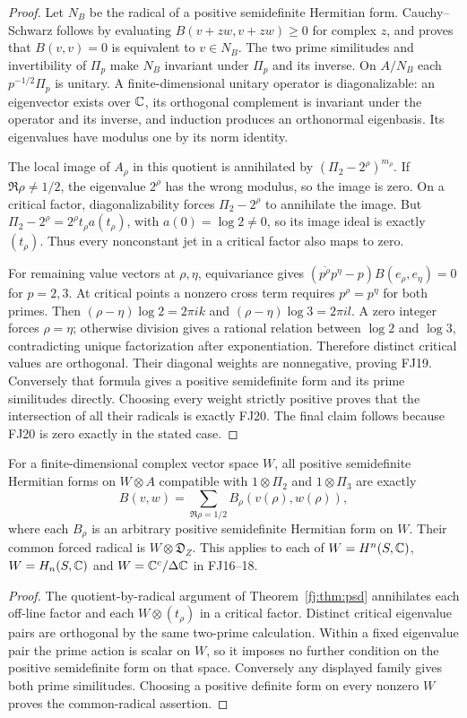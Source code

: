\begin{proof}
Let $N_B$ be the radical of a positive semidefinite Hermitian form.
Cauchy--Schwarz follows by evaluating $B(v+zw,v+zw)\ge0$ for complex
$z$, and proves that $B(v,v)=0$ is equivalent to $v\in N_B$.
The two prime similitudes and invertibility of $\Pi_p$ make $N_B$
invariant under $\Pi_p$ and its inverse. On $A/N_B$ each
$p^{-1/2}\Pi_p$ is unitary. A finite-dimensional unitary operator is
diagonalizable: an eigenvector exists over $\mathbb C$, its orthogonal
complement is invariant under the operator and its inverse, and
induction produces an orthonormal eigenbasis. Its eigenvalues have
modulus one by its norm identity.

The local image of $A_\rho$ in this quotient is annihilated by
$(\Pi_2-2^\rho)^{m_\rho}$. If $\Re\rho\ne1/2$, the eigenvalue
$2^\rho$ has the wrong modulus, so the image is zero. On a critical
factor, diagonalizability forces $\Pi_2-2^\rho$ to annihilate the
image. But
$\Pi_2-2^\rho=2^\rho t_\rho a(t_\rho)$, with
$a(0)=\log2\ne0$, so its image ideal is exactly $(t_\rho)$.
Thus every nonconstant jet in a critical factor also maps to zero.

For remaining value vectors at $\rho,\eta$, equivariance gives
$(\overline{p^\rho}p^\eta-p)B(e_\rho,e_\eta)=0$ for $p=2,3$.
At critical points a nonzero cross term requires
$p^\rho=p^\eta$ for both primes. Then
$(\rho-\eta)\log2=2\pi ik$ and
$(\rho-\eta)\log3=2\pi il$. A zero integer forces $\rho=\eta$;
otherwise division gives a rational relation between $\log2$ and
$\log3$, contradicting unique factorization after exponentiation.
Therefore distinct critical values are orthogonal. Their diagonal
weights are nonnegative, proving FJ19. Conversely that formula gives
a positive semidefinite form and its prime similitudes directly.
Choosing every weight strictly positive proves that the intersection
of all their radicals is exactly FJ20. The final claim follows because
FJ20 is zero exactly in the stated case.
\end{proof}

\begin{corollary}
For a finite-dimensional complex vector space $W$, all positive
semidefinite Hermitian forms on $W\otimes A$ compatible with
$1\otimes\Pi_2$ and $1\otimes\Pi_3$ are exactly
\[
 B(v,w)=\sum_{\Re\rho=1/2}B_\rho(v(\rho),w(\rho)),
\]
where each $B_\rho$ is an arbitrary positive semidefinite Hermitian
form on $W$. Their common forced radical is $W\otimes\mathfrak D_Z$.
This applies to each of $W=H^n(S,\mathbb C)$,
$W=H_n(S,\mathbb C)$ and $W=\mathbb C^c/\Delta\mathbb C$ in FJ16--18.
\end{corollary}
\begin{proof}
The quotient-by-radical argument of Theorem~\ref{fj:thm:psd} annihilates
each off-line factor and each $W\otimes(t_\rho)$ in a critical factor.
Distinct critical eigenvalue pairs are orthogonal by the same two-prime
calculation. Within a fixed eigenvalue pair the prime action is scalar
on $W$, so it imposes no further condition on the positive semidefinite
form on that space. Conversely any displayed family gives both prime
similitudes. Choosing a positive definite form on every nonzero $W$
proves the common-radical assertion.
\end{proof}

